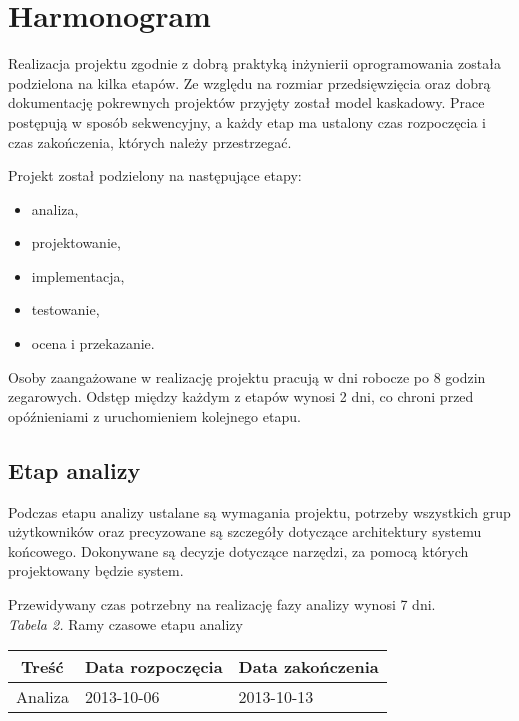 \documentclass [11pt, a4paper, leqno]	{article}	%
\begin{document}
\section{Harmonogram}
\noindent
Realizacja projektu zgodnie z dobrą praktyką inżynierii oprogramowania została podzielona na kilka etapów. Ze względu na rozmiar przedsięwzięcia oraz dobrą dokumentację pokrewnych projektów przyjęty został model kaskadowy. Prace postępują w sposób sekwencyjny, a każdy etap ma ustalony czas rozpoczęcia i czas zakończenia, których należy przestrzegać.

Projekt został podzielony na następujące etapy:
\begin{itemize}
	\item analiza,
	\item projektowanie,
	\item implementacja,
	\item testowanie,
	\item ocena i przekazanie.
\end{itemize}

Osoby zaangażowane w realizację projektu pracują w dni robocze po 8 godzin zegarowych. Odstęp między każdym z etapów wynosi 2 dni, co chroni przed opóźnieniami z uruchomieniem kolejnego etapu.

\subsection{Etap analizy}
\noindent
Podczas etapu analizy ustalane są wymagania projektu, potrzeby wszystkich grup użytkowników oraz precyzowane są szczegóły dotyczące architektury systemu końcowego. Dokonywane są decyzje dotyczące narzędzi, za pomocą których projektowany będzie system. 

Przewidywany czas potrzebny na realizację fazy analizy wynosi 7 dni. \\


\textit{Tabela 2.} Ramy czasowe etapu analizy

\begin{center}
	\begin{tabular}{| l | l | l |}
		\hline
		\multicolumn{1}{|c|}{Treść} & 
		\multicolumn{1}{|c|}{Data rozpoczęcia} & 
		\multicolumn{1}{|c|}{Data zakończenia} \\ \hline \hline
		Analiza & 2013-10-06 & 2013-10-13 \\ \hline
	\end{tabular}
\end{center}
\end{document}
